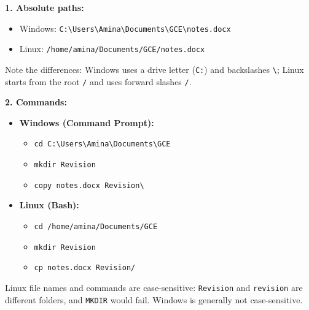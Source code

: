 \documentclass[11pt]{article}
\begin{document}
\begin{corrige}
\textbf{1. Absolute paths:}
\begin{itemize}
\item Windows: \texttt{C:\textbackslash Users\textbackslash Amina\textbackslash Documents\textbackslash GCE\textbackslash notes.docx}
\item Linux: \texttt{/home/amina/Documents/GCE/notes.docx}
\end{itemize}
Note the differences: Windows uses a drive letter (\texttt{C:}) and backslashes \texttt{\textbackslash}; Linux starts from the root \texttt{/} and uses forward slashes \texttt{/}.

\textbf{2. Commands:}
\begin{itemize}
\item \textbf{Windows (Command Prompt):}
\begin{itemize}
\item \texttt{cd C:\textbackslash Users\textbackslash Amina\textbackslash Documents\textbackslash GCE}
\item \texttt{mkdir Revision}
\item \texttt{copy notes.docx Revision\textbackslash}
\end{itemize}
\item \textbf{Linux (Bash):}
\begin{itemize}
\item \texttt{cd /home/amina/Documents/GCE}
\item \texttt{mkdir Revision}
\item \texttt{cp notes.docx Revision/}
\end{itemize}
\end{itemize}
\begin{attention}
Linux file names and commands are case-sensitive: \texttt{Revision} and \texttt{revision} are different folders, and \texttt{MKDIR} would fail. Windows is generally not case-sensitive.
\end{attention}
\end{corrige}
\end{document}
